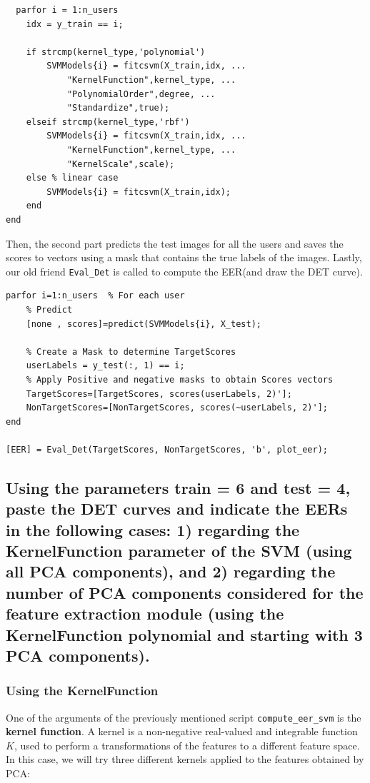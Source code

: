 \documentclass[a4paper]{article}
\def\inline{\lstinline[basicstyle=\ttfamily,keywordstyle={}]}
\begin{document}
\begin{verbatim}
  parfor i = 1:n_users
    idx = y_train == i;

    if strcmp(kernel_type,'polynomial')
        SVMModels{i} = fitcsvm(X_train,idx, ...
            "KernelFunction",kernel_type, ...
            "PolynomialOrder",degree, ...
            "Standardize",true);
    elseif strcmp(kernel_type,'rbf')
        SVMModels{i} = fitcsvm(X_train,idx, ...
            "KernelFunction",kernel_type, ...
            "KernelScale",scale);
    else % linear case
        SVMModels{i} = fitcsvm(X_train,idx);
    end
end
\end{verbatim}

Then, the second part predicts the test images for all the users and saves the scores to vectors using a mask that contains the true labels of the images. Lastly, our old friend \inline{Eval_Det} is called to compute the EER(and draw the DET curve).

\begin{verbatim}
parfor i=1:n_users  % For each user
    % Predict 
    [none , scores]=predict(SVMModels{i}, X_test);

    % Create a Mask to determine TargetScores
    userLabels = y_test(:, 1) == i;
    % Apply Positive and negative masks to obtain Scores vectors
    TargetScores=[TargetScores, scores(userLabels, 2)'];
    NonTargetScores=[NonTargetScores, scores(~userLabels, 2)'];
end

[EER] = Eval_Det(TargetScores, NonTargetScores, 'b', plot_eer);
\end{verbatim}


\subsection{ Using the parameters train = 6 and test = 4, paste the DET curves and indicate the EERs in the following cases: 1) regarding the KernelFunction parameter of the SVM (using all PCA components), and 2) regarding the number of PCA components considered for the feature extraction module (using the KernelFunction polynomial and starting with 3 PCA components).}

\subsubsection{Using the KernelFunction}

One of the arguments of the previously mentioned script \inline{compute_eer_svm} is the \textbf{kernel function}. A kernel is a non-negative real-valued and integrable function \(K\), used to perform a transformations of the features to a different feature space. In this case, we will try three different kernels applied to the features obtained by PCA:
\end{document}
